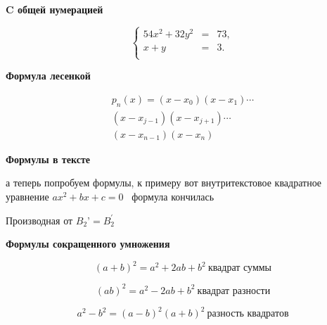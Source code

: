 \documentclass [12pt]{article}
\begin{document}
	\begin{center}
		\textbf{C общей нумерацией}
	\end{center}

	\begin{equation}\label{eq:syst}
		\left\{
			\begin{array}{rcl}
			54x^2+32y^2&=&73,\\
			x+y&=&3.\\
		\end{array}
		\right.
	\end{equation}

	\begin {center}
		\textbf{Формула лесенкой}
	\end {center}

	\begin{multline}
		p_n(x) =(x - x_0)(x - x_1)
		\cdots \\
		(x - x_{j-1})(x - x_{j+1})
		\cdots \\
		(x - x_{n-1})(x - x_n)
	\end{multline}

	\begin {center}
  		\textbf{Формулы в тексте}
	\end {center}
	а теперь попробуем формулы, к примеру вот внутритекстовое квадратное
уравнение $ax^2+bx+c=0$ \ формула кончилась

	Производная от
	\begin {math}B_2’ = B_2^\prime \end{math}

	\begin {center}
  		\textbf{Формулы сокращенного умножения}
	\end {center}

	$$
		(a+b)^2=a^2+2ab+b^2 \ \text{квадрат суммы} 
	$$

	$$
		(ab)^2=a^2-2ab+b^2 \ \text{квадрат разности}
	$$
	
	$$ 
  		a^2-b^2=(a-b)^2(a+b)^2\ \text{разность квадратов}
	$$
\end{document}
